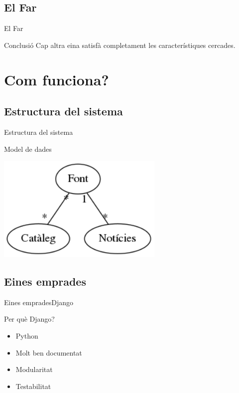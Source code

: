 \documentclass{beamer}
\begin{document}
\subsection{El Far}

\begin{frame}{El Far}
    \begin{block}{Conclusió}
        Cap altra eina satisfà completament les característiques cercades.
    \end{block}
\end{frame}


\section{Com funciona?}

\subsection{Estructura del sistema}

\begin{frame}{Estructura del sistema}
    \begin{block}{Model de dades}
        \begin{center}
            \includegraphics[width=0.6\textwidth]{graph.png}
        \end{center}
    \end{block}
\end{frame}

\subsection{Eines emprades}

\begin{frame}{Eines emprades}{Django}
    \begin{block}{Per què Django?}
        \begin{itemize}
            \item Python
            \pause{}
            \item Molt ben documentat
            \pause{}
            \item Modularitat
            \pause{}
            \item Testabilitat
        \end{itemize}
    \end{block}
\end{frame}
\end{document}
